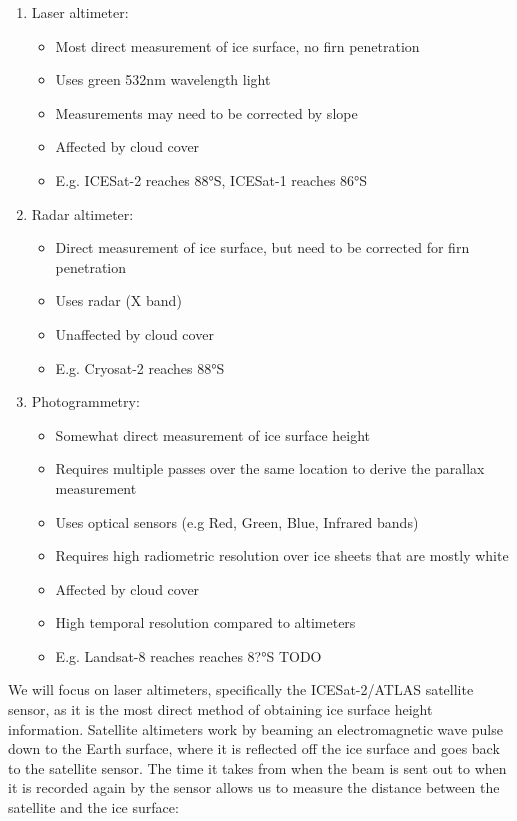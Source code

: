 \begin{enumerate}
  \item Laser altimeter:
  \begin{itemize}
    \item Most direct measurement of ice surface, no firn penetration
    \item Uses green 532nm wavelength light
    \item Measurements may need to be corrected by slope
    \item Affected by cloud cover
    \item E.g. ICESat-2 reaches 88°S, ICESat-1 reaches 86°S
  \end{itemize}

  \item Radar altimeter:
  \begin{itemize}
    \item Direct measurement of ice surface, but need to be corrected for firn penetration
    \item Uses radar (X band)
    \item Unaffected by cloud cover
    \item E.g. Cryosat-2 reaches 88°S
  \end{itemize}

  \item Photogrammetry:
  \begin{itemize}
    \item Somewhat direct measurement of ice surface height
    \item Requires multiple passes over the same location to derive the parallax measurement
    \item Uses optical sensors (e.g Red, Green, Blue, Infrared bands)
    \item Requires high radiometric resolution over ice sheets that are mostly white
    \item Affected by cloud cover
    \item High temporal resolution compared to altimeters
    \item E.g. Landsat-8 reaches reaches 8?°S TODO
  \end{itemize}
\end{enumerate}

We will focus on laser altimeters, specifically the ICESat-2/ATLAS satellite sensor, as it is the most direct method of obtaining ice surface height information.
Satellite altimeters work by beaming an electromagnetic wave pulse down to the Earth surface, where it is reflected off the ice surface and goes back to the satellite sensor.
The time it takes from when the beam is sent out to when it is recorded again by the sensor allows us to measure the distance between the satellite and the ice surface:

